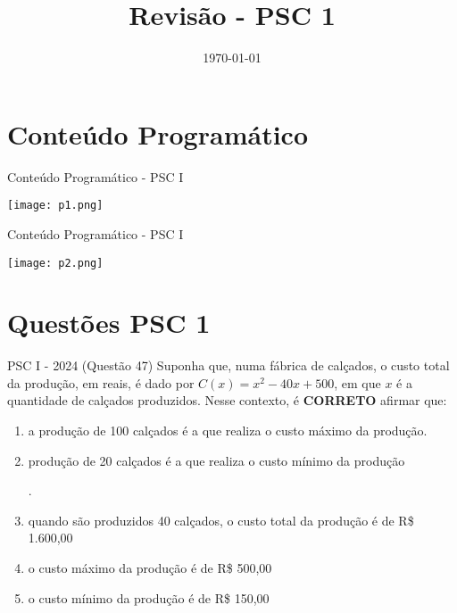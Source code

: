 \documentclass[aspectratio=169]{beamer}
\title[CETi Gilberto Mestrinho]{Revisão - PSC 1}
\date{\today}
\newif\ifusarcorvermelha
\newcommand{\vermelho}[1]{%
    \ifusarcorvermelha
        {\color{red}#1}%
    \else
        #1%
    \fi
}
\begin{document}
\justifying
\onehalfspacing


\begin{frame}
    \titlepage
\end{frame}

\section{Conteúdo Programático}

\begin{frame}{Conteúdo Programático - PSC I}

    \begin{center}
        \texttt{[image: p1.png]}
    \end{center}
    
\end{frame}

\begin{frame}{Conteúdo Programático - PSC I}

    \begin{center}
        \texttt{[image: p2.png]}
    \end{center}
    
\end{frame}

\section{Questões PSC 1}

    \begin{frame}{PSC I - 2024 (Questão 47)}
        Suponha que, numa fábrica de calçados, o custo total da produção, em reais, é dado por $C(x) = x^{2}-40x+500$, em que $x$ é a quantidade de calçados produzidos. Nesse contexto, é \textbf{CORRETO} afirmar que:

            \begin{enumerate}[a]
                \item a produção de 100 calçados é a que realiza o custo máximo da produção.
                \item \vermelho{produção de 20 calçados é a que realiza o custo mínimo da produção}.  %
                \item quando são produzidos 40 calçados, o custo total da produção é de R\$ 1.600,00
                \item o custo máximo da produção é de R\$ 500,00
                \item o custo mínimo da produção é de R\$ 150,00
            \end{enumerate}
            
    \end{frame}
\end{document}
